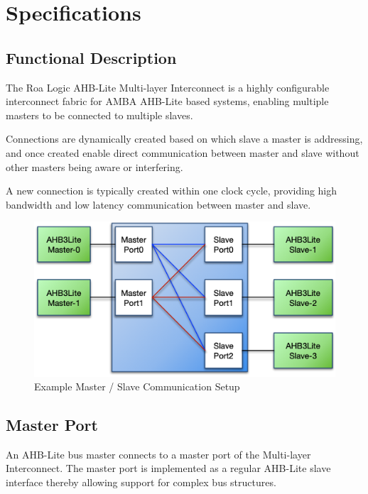 \chapter{Specifications}\label{specifications}

\section{Functional Description}\label{functional-description}

The Roa Logic AHB-Lite Multi-layer Interconnect is a highly configurable
interconnect fabric for AMBA AHB-Lite based systems, enabling multiple
masters to be connected to multiple slaves.

Connections are dynamically created based on which slave a master is
addressing, and once created enable direct communication between master
and slave without other masters being aware or interfering.

A new connection is typically created within one clock cycle, providing
high bandwidth and low latency communication between master and slave.

\begin{figure}[tbh]
	\centering
	\includegraphics{assets/img/ahb-lite-switch-sys1}
	\caption{Example Master / Slave Communication Setup}
	\label{fig:ahb-lite-switch-sys1}
\end{figure}

\section{Master Port}\label{master-port}

An AHB-Lite bus master connects to a master port of the Multi-layer
Interconnect. The master port is implemented as a regular AHB-Lite slave
interface thereby allowing support for complex bus structures.

